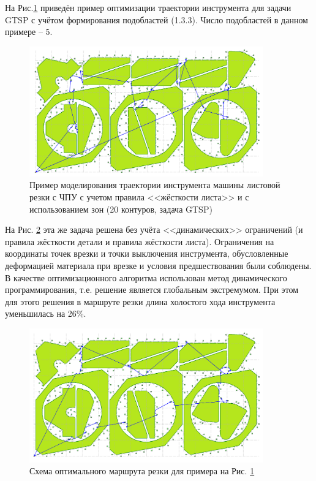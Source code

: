 \documentclass[11pt,twoside]{report}
\begin{document}
На Рис.\ref{zones-a}
приведён пример оптимизации траектории
инструмента для задачи GTSP с учётом
формирования подобластей  (1.3.3).
Число подобластей в данном примере – 5.

\begin{figure}
  \begin{center}
  \includegraphics[width=0.9\textwidth]{zones-a.png}
  \caption{Пример моделирования траектории инструмента машины листовой резки с ЧПУ
    с учетом правила <<жёсткости листа>> и с использованием зон (20 контуров, задача GTSP)}
  \label{zones-a}
  \end{center}
\end{figure}

На Рис. \ref{zones-b}
эта же задача решена без учёта
<<динамических>> ограничений
(и правила жёсткости детали и правила жёсткости листа).
Ограничения на координаты точек врезки и
точки выключения инструмента,
обусловленные деформацией материала при врезке и
условия предшествования были соблюдены.
В качестве оптимизационного алгоритма
использован метод динамического программирования,
т.е. решение является глобальным экстремумом.
При этом для этого решения в маршруте резки
длина холостого хода инструмента уменьшилась на 26\%.

\begin{figure}
  \begin{center}
  \includegraphics[width=0.9\textwidth]{zones-b.png}
  \caption{Схема оптимального маршрута резки для примера на Рис. \ref{zones-a}}
  \label{zones-b}
  \end{center}
\end{figure}
\end{document}
